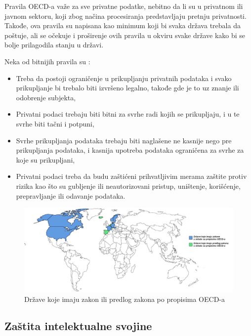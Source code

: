 \documentclass[a4paper]{article}
\begin{document}
{Pravila OECD-a važe za sve privatne podatke, nebitno da li su u privatnom ili javnom sektoru, koji zbog načina procesiranja predstavljaju pretnju privatnosti. Takođe, ova pravila su napisana kao minimum koji bi svaka država trebala da poštuje, ali se očekuje i proširenje ovih pravila u okviru svake države kako bi se bolje prilagodila stanju u državi.

Neka od bitnijih pravila su \cite{Property}:

\begin{itemize}
	\item{Treba da postoji ograničenje u prikupljanju privatnih podataka i svako prikupljanje bi trebalo biti izvršeno legalno, takođe gde je to uz znanje ili odobrenje subjekta,}
	\item{Privatni podaci trebaju biti bitni za svrhe radi kojih se prikupljaju, i u te svrhe biti tačni i potpuni,}
	\item{Svrhe prikupljanja podataka trebaju biti naglašene ne kasnije nego pre prikupljanja podataka, i kasnija upotreba podataka ograničena za svrhe za koje su prikupljani,}
	\item{Privatni podaci treba da budu zaštićeni prihvatljivim merama zaštite protiv rizika kao što su gubljenje ili neautorizovani pristup, uništenje, korišćenje, prepravljanje ili odavanje podataka.}
\end{itemize}

\begin{figure}[h!]
\begin{center}

\includegraphics[scale=0.2,natwidth=1456,natheight=590]{karta.png}
\end{center}
\caption{Države koje imaju zakon ili predlog zakona po propisima OECD-a}
\label{karta}
\end{figure}

\subsection{Zaštita intelektualne svojine}

}
\end{document}
